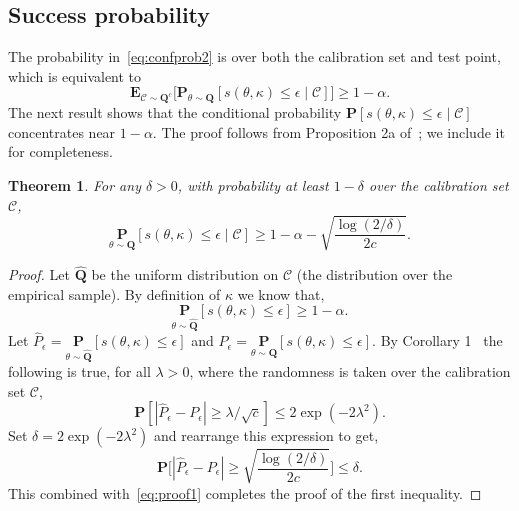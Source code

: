 \documentclass[12pt]{article}
\renewcommand{\cite}[1]{\citep{#1}}
\newtheorem{theorem}{Theorem}[section]     %
\theoremstyle{definition}
\theoremstyle{remark}
\newcommand{\paramdist}{\mathbf{Q}}
\newcommand{\param}{\theta}
\newcommand{\Prob}{\mathbf{P}}
\newcommand{\E}{\mathbf{E}}
\newcommand{\tol}{\epsilon}
\newcommand{\calibration}{\mathcal{C}}
\newcommand{\termov}{s}
\newcommand{\lt}{\kappa}
\newcommand{\ncalib}{c}
\newcommand{\paramdist}{\mathbf{Q}}
\newcommand{\param}{\theta}
\newcommand{\Prob}{\mathbf{P}}
\newcommand{\E}{\mathbf{E}}
\newcommand{\tol}{\epsilon}
\newcommand{\calibration}{\mathcal{C}}
\newcommand{\termov}{s}
\newcommand{\lt}{\kappa}
\newcommand{\ncalib}{c}
\theoremstyle{plain}
\newtheorem{theorem}{Theorem}[section]
\theoremstyle{definition}
\theoremstyle{remark}
\begin{document}
\subsection{Success probability} \label{sec:success}
The probability in~\eqref{eq:confprob2} is over both the calibration set and test point, which is equivalent to
\begin{equation*}
    \E_{\calibration \sim \paramdist^\ncalib}\Big[ \Prob_{\param \sim \paramdist}[\termov(\param, \lt) \le \tol \mid \calibration]\Big] \ge 1 - \alpha.
\end{equation*}
The next result shows that the conditional probability $\Prob[\termov(\param, \lt) \le \tol \mid \calibration]$ concentrates near $1 - \alpha$.
The proof follows from Proposition 2a of~\citet{Vovk2012ConditionalVO}; we include it for completeness.
\begin{theorem} \label{thm:condprob}
    For any $\delta > 0$, with probability at least $1 - \delta$ over the calibration set $\calibration$,
    \begin{equation*}
        \underset{\param \sim \paramdist}{\Prob}[\termov(\param, \lt) \le \tol \mid \calibration] \ge 1 - \alpha - \sqrt{\frac{\log(2/\delta)}{2\ncalib}}.
    \end{equation*}
\end{theorem}
\begin{proof}
    Let $\hat{\paramdist}$ be the uniform distribution on $\calibration$ (the distribution over the empirical sample).
    By definition of $\lt$ we know that,
    \begin{equation} \label{eq:proof1}
        \underset{\param \sim \hat{\paramdist}}{\Prob} [\termov(\param, \lt) \le \tol] \ge 1 - \alpha.
    \end{equation}
    Let $\hat{P}_\epsilon = \underset{\param \sim \hat{\paramdist}}{\Prob} [\termov(\param, \lt) \le \tol]$ and $P_\epsilon = \underset{\param \sim\paramdist}{\Prob} [\termov(\param, \lt) \le \tol]$.
    By Corollary 1~\cite{Massart1990TheTC} the following is true, for all $\lambda > 0$, where the randomness is taken over the calibration set $\calibration$,
    \begin{equation*}
        \Prob[|\hat{P}_\epsilon -  P_\epsilon| \ge \lambda /\sqrt{\ncalib}] \le 2 \exp(-2 \lambda^2).
    \end{equation*}
    Set $\delta = 2 \exp(-2 \lambda^2)$ and rearrange this expression to get,
    \begin{equation*}
    \Prob\Bigg[|\hat{P}_\epsilon -  P_\epsilon| \ge \sqrt{\frac{\log(2/\delta)}{2\ncalib}}\Bigg] \le \delta.
    \end{equation*}
    This combined with~\eqref{eq:proof1} completes the proof of the first inequality.
\end{proof}
\end{document}
